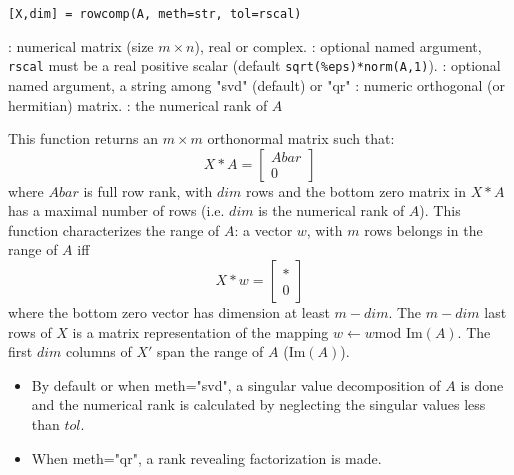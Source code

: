 
\begin{mandesc}
\end{mandesc}

\begin{calling_sequence}
\begin{verbatim}
[X,dim] = rowcomp(A, meth=str, tol=rscal) 
\end{verbatim}
\end{calling_sequence}
\begin{parameters}
  \begin{varlist}
    :  numerical matrix (size $m \times n$), real or complex.
    : optional named argument, \verb+rscal+ must be  a real positive scalar (default \verb+sqrt(%eps)*norm(A,1)+).
    : optional named argument, a string among "svd" (default) or "qr"
    : numeric orthogonal (or hermitian) matrix.
    : the numerical rank of $A$
  \end{varlist}
\end{parameters}

\begin{mandescription}
This function returns an $m \times m$ orthonormal matrix such that:
$$
  X*A  = \left[ \begin{array}{c} Abar \\ 0 \end{array} \right] 
$$
where $Abar$ is full row rank, with $dim$ rows and the bottom zero matrix
in $X*A$ has a maximal number of rows (i.e. $dim$ is the numerical rank of $A$).
This function characterizes the range of $A$: a vector $w$, with $m$ rows
belongs in the range of $A$ iff 
$$
X*w  = \left[ \begin{array}{c} \ast \\ 0 \end{array} \right]
$$
where the bottom zero vector has dimension at least $m-dim$.
The $m-dim$ last rows of $X$ is a matrix representation of the mapping
$w \leftarrow w \text{mod Im} (A)$. 
The first $dim$ columns of $X'$ span the range of $A$ ($\text{Im}(A)$).
\begin{itemize}
\item By default or when  meth="svd", a singular value decomposition 
of $A$ is done and the numerical rank is calculated by 
neglecting the singular values less than $tol$.
\item When  meth="qr", a rank revealing factorization is made.
\end{itemize}
\end{mandescription}

